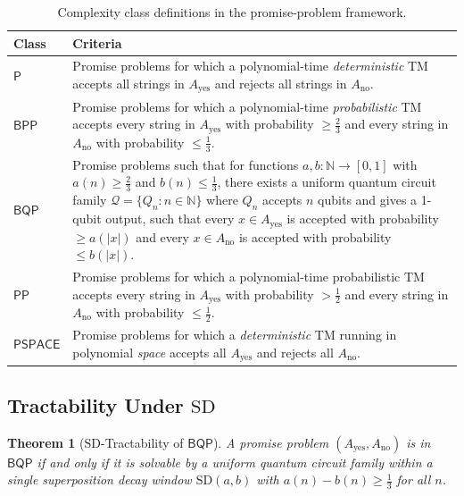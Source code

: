 \documentclass[12pt, a4paper]{article}
\theoremstyle{plain}
\newtheorem{theorem}{Theorem}[section]
\theoremstyle{definition}
\theoremstyle{remark}
\newcommand{\pspace}{\ensuremath{\mathsf{PSPACE}}}
\newcommand{\bqp}{\ensuremath{\mathsf{BQP}}}
\newcommand{\bpp}{\ensuremath{\mathsf{BPP}}}
\newcommand{\pp}{\ensuremath{\mathsf{PP}}}
\newcommand{\Pcls}{\ensuremath{\mathsf{P}}}
\newcommand{\SD}{\ensuremath{\mathrm{SD}}}   %
\newcommand{\QC}{\ensuremath{\mathcal{Q}}}   %
\newcommand{\Nat}{\mathbb{N}}
\begin{document}
\begin{table}[h]
\centering
\renewcommand{\arraystretch}{1.5}
\begin{tabular}{@{}>{\bfseries}p{1.8cm}p{10.5cm}@{}}
  \toprule
  Class & Criteria \\
  \midrule
  $\Pcls$ &
    Promise problems for which a polynomial-time \emph{deterministic} TM
    accepts all strings in $A_{\text{yes}}$ and rejects all strings in
    $A_{\text{no}}$.
  \\
  $\bpp$ &
    Promise problems for which a polynomial-time \emph{probabilistic} TM
    accepts every string in $A_{\text{yes}}$ with probability $\geq \tfrac{2}{3}$
    and every string in $A_{\text{no}}$ with probability $\leq \tfrac{1}{3}$.
  \\
  $\bqp$ &
    Promise problems such that for functions $a, b : \Nat \to [0,1]$ with
    $a(n) \geq \tfrac{2}{3}$ and $b(n) \leq \tfrac{1}{3}$, there exists a
    uniform quantum circuit family $\QC = \{Q_n : n \in \Nat\}$ where
    $Q_n$ accepts $n$ qubits and gives a 1-qubit output, such that every
    $x \in A_{\text{yes}}$ is accepted with probability $\geq a(|x|)$ and
    every $x \in A_{\text{no}}$ is accepted with probability $\leq b(|x|)$.
  \\
  $\pp$ &
    Promise problems for which a polynomial-time probabilistic TM accepts
    every string in $A_{\text{yes}}$ with probability $> \tfrac{1}{2}$ and
    every string in $A_{\text{no}}$ with probability $\leq \tfrac{1}{2}$.
  \\
  $\pspace$ &
    Promise problems for which a \emph{deterministic} TM running in
    polynomial \emph{space} accepts all $A_{\text{yes}}$ and rejects all
    $A_{\text{no}}$.
  \\
  \bottomrule
\end{tabular}
\caption{Complexity class definitions in the promise-problem framework.}
\label{tab:classes}
\end{table}

\subsection{Tractability Under \SD}

\begin{theorem}[\SD-Tractability of \bqp]
  \label{thm:bqp}
  A promise problem $(A_{\text{yes}}, A_{\text{no}})$ is in $\bqp$ if and
  only if it is solvable by a uniform quantum circuit family within a single
  superposition decay window $\SD(a, b)$ with $a(n) - b(n) \geq \tfrac{1}{3}$
  for all $n$.
\end{theorem}
\end{document}
